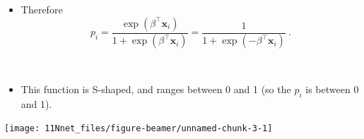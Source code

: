 \documentclass[10pt,ignorenonframetext,]{beamer}
\providecommand{\tightlist}{%
  \setlength{\itemsep}{0pt}\setlength{\parskip}{0pt}}
\begin{document}
\begin{frame}

\begin{itemize}
\tightlist
\item
  Therefore \[
  p_i = \frac{\exp(\beta^\top {\boldsymbol x}_i)}{1+\exp(\beta^\top {\boldsymbol x}_i)} = \frac{1}{1+\exp(-\beta^\top {\boldsymbol x}_i)} \ .
  \]
\end{itemize}

\(~\)

\begin{itemize}
\tightlist
\item
  This function is S-shaped, and ranges between 0 and 1 (so the \(p_i\)
  is between 0 and 1).
\end{itemize}

\begin{center}\texttt{[image: 11Nnet\_files/figure-beamer/unnamed-chunk-3-1]} \end{center}

\end{frame}
\end{document}

